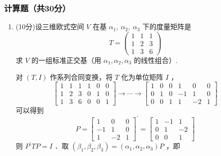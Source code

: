 \subsubsection*{计算题（共30分）}

\begin{enumerate}
    \item (10分)设三维欧式空间 $V$ 在基 $\alpha_1, ~ \alpha_2, ~ \alpha_3$ 下的度量矩阵是
    \begin{equation*}
    T=\left(\begin{array}{lll}
    1 & 1 & 1 \\
    1 & 2 & 3 \\
    1 & 3 & 6
    \end{array}\right)
    \end{equation*}
    求 $V$ 的一组标准正交基（用 $\alpha_1, \alpha_2, \alpha_3$ 的线性组合）.
    \begin{solution}
        对 $(T, I)$ 作系列合同变换，将 $T$ 化为单位矩阵 $I$ ，
        \begin{equation*}
        \left[\begin{array}{rrrrrr}
        1 & 1 & 1 & 1 & 0 & 0 \\
        1 & 2 & 3 & 0 & 1 & 0 \\
        1 & 3 & 6 & 0 & 0 & 1
        \end{array}\right] \rightarrow \cdots \rightarrow\left[\begin{array}{cccccc}
        1 & 0 & 0 & 1 & 0 & 0 \\
        0 & 1 & 0 & -1 & 1 & 0 \\
        0 & 0 & 1 & 1 & -2 & 1
        \end{array}\right]
        \end{equation*}
        可以得到
        \begin{equation*}
        P=\left[\begin{array}{ccc}
        1 & 0 & 0 \\
        -1 & 1 & 0 \\
        1 & -2 & 1
        \end{array}\right]^{\prime}=\left[\begin{array}{ccc}
        1 & -1 & 1 \\
        0 & 1 & -2 \\
        0 & 0 & 1
        \end{array}\right]
        \end{equation*}
        则 $P^{\prime} T P=I$ ．取 $\left(\beta_1, \beta_2, \beta_3\right)=\left(\alpha_1, \alpha_2, \alpha_3\right) P$ ，即

\end{solution}
\end{enumerate}
